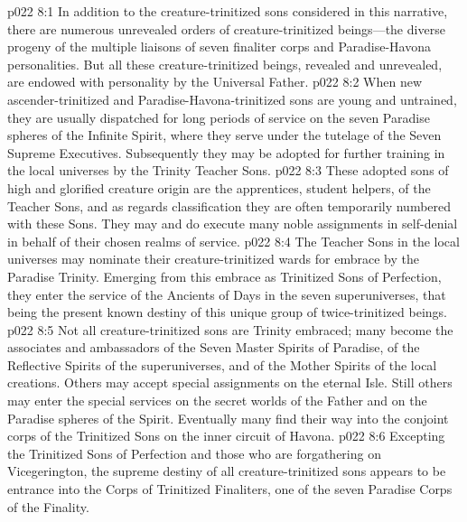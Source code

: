 %
\vs p022 8:1 In addition to the creature\hyp{}trinitized sons considered in this narrative, there are numerous unrevealed orders of creature\hyp{}trinitized beings---the diverse progeny of the multiple liaisons of seven finaliter corps and Paradise\hyp{}Havona personalities. But all these creature\hyp{}trinitized beings, revealed and unrevealed, are endowed with personality by the Universal Father.
\pc \vs p022 8:2 When new ascender\hyp{}trinitized and Paradise\hyp{}Havona\hyp{}trinitized sons are young and untrained, they are usually dispatched for long periods of service on the seven Paradise spheres of the Infinite Spirit, where they serve under the tutelage of the Seven Supreme Executives. Subsequently they may be adopted for further training in the local universes by the Trinity Teacher Sons.\plusone
\vs p022 8:3 These adopted sons of high and glorified creature origin are the apprentices, student helpers, of the Teacher Sons, and as regards classification they are often temporarily numbered with these Sons. They may and do execute many noble assignments in self\hyp{}denial in behalf of their chosen realms of service.
\vs p022 8:4 The Teacher Sons in the local universes may nominate their creature\hyp{}trinitized wards for embrace by the Paradise Trinity. Emerging from this embrace as Trinitized Sons of Perfection, they enter the service of the Ancients of Days in the seven superuniverses, that being the present known destiny of this unique group of twice\hyp{}trinitized beings.
\vs p022 8:5 Not all creature\hyp{}trinitized sons are Trinity embraced; many become the associates and ambassadors of the Seven Master Spirits of Paradise, of the Reflective Spirits of the superuniverses, and of the Mother Spirits of the local creations. Others may accept special assignments on the eternal Isle. Still others may enter the special services on the secret worlds of the Father and on the Paradise spheres of the Spirit. Eventually many find their way into the conjoint corps of the Trinitized Sons on the inner circuit of Havona.
\vs p022 8:6 Excepting the Trinitized Sons of Perfection and those who are forgathering on Vicegerington, the supreme destiny of all creature\hyp{}trinitized sons appears to be entrance into the Corps of Trinitized Finaliters, one of the seven Paradise Corps of the Finality.
